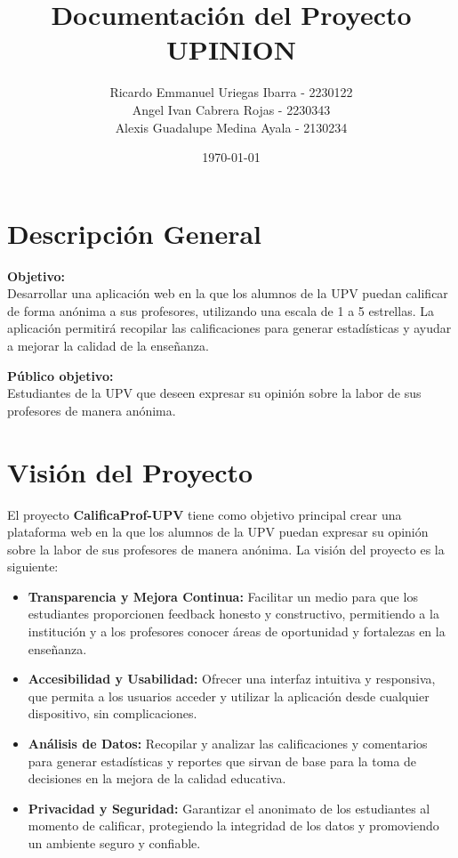 \documentclass[11pt]{article}
\title{Documentación del Proyecto UPINION}
\author{Ricardo Emmanuel Uriegas Ibarra - 2230122 \\ Angel Ivan Cabrera Rojas - 2230343 \\ Alexis Guadalupe Medina Ayala - 2130234}
\date{\today}
\begin{document}
\maketitle
\tableofcontents
\newpage

\section{Descripción General}

\textbf{Objetivo:} \\
Desarrollar una aplicación web en la que los alumnos de la UPV puedan calificar de forma anónima a sus profesores, utilizando una escala de 1 a 5 estrellas. La aplicación permitirá recopilar las calificaciones para generar estadísticas y ayudar a mejorar la calidad de la enseñanza.

\bigskip
\textbf{Público objetivo:} \\
Estudiantes de la UPV que deseen expresar su opinión sobre la labor de sus profesores de manera anónima.

\newpage
\section{Visión del Proyecto}

El proyecto \textbf{CalificaProf-UPV} tiene como objetivo principal crear una plataforma web en la que los alumnos de la UPV puedan expresar su opinión sobre la labor de sus profesores de manera anónima. La visión del proyecto es la siguiente:

\begin{itemize}
    \item \textbf{Transparencia y Mejora Continua:} Facilitar un medio para que los estudiantes proporcionen feedback honesto y constructivo, permitiendo a la institución y a los profesores conocer áreas de oportunidad y fortalezas en la enseñanza.
    \item \textbf{Accesibilidad y Usabilidad:} Ofrecer una interfaz intuitiva y responsiva, que permita a los usuarios acceder y utilizar la aplicación desde cualquier dispositivo, sin complicaciones.
    \item \textbf{Análisis de Datos:} Recopilar y analizar las calificaciones y comentarios para generar estadísticas y reportes que sirvan de base para la toma de decisiones en la mejora de la calidad educativa.
    \item \textbf{Privacidad y Seguridad:} Garantizar el anonimato de los estudiantes al momento de calificar, protegiendo la integridad de los datos y promoviendo un ambiente seguro y confiable.
\end{itemize}
\end{document}
